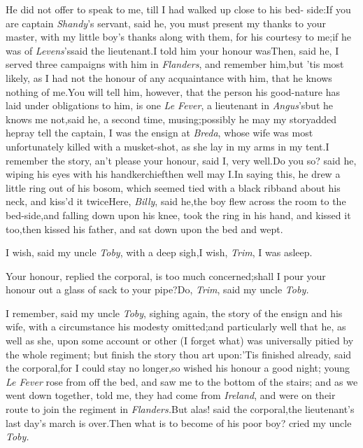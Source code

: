 \documentclass{article}
\begin{document}
He did not offer to speak to me, till I had walked up close to
his bed- side:\tsk If you are captain \textit{Shandy}’s
servant, said he, you must present my thanks to your master, with
my little boy’s thanks along with them, for his courtesy to
me;\tsk if he was of \textit{Levens}’s\tsk said the
lieutenant.\tsk I told him your honour was\tsk Then, said he, I
served three campaigns with him in \textit{Flanders}, and remember
him,\tsk but ’tis most likely, as I had not the honour of
any acquaintance with him, that he knows nothing of me.\tsh You will tell him, however, that
the person his good-nature has laid under obligations to him, is
one \textit{Le Fever}, a lieutenant in
\textit{Angus}’s\tsh but he knows me not,\tsk said
he, a second time, musing;\tsh possibly he may my
story\tsk added he\tsk pray tell the captain, I was the ensign
at \textit{Breda}, whose wife was most unfortunately killed with a
musket-shot, as she lay in my arms in my tent.\tsh I
remember the story, an’t please your honour, said I, very
well.\tsh Do you so? said he, wiping his eyes with his
handkerchief\tsk then well may I.\tsk In saying this, he drew a
little ring out of his bosom, which seemed tied with a black
ribband about his neck, and kiss’d it
twice\tsh Here, \textit{Billy}, said he,\tsk the boy flew
across the room to the bed-side,\tsk and falling down upon his
knee, took the ring in his hand, and kissed it too,\tsk then
kissed his father, and sat down upon the bed and wept.

I wish, said my uncle \textit{Toby}, with a deep sigh,\tsk I
wish, \textit{Trim}, I was asleep.

Your honour, replied the corporal, is too much
concerned;\tsk shall I pour your honour out a glass of sack to
your pipe?\tsh Do, \textit{Trim}, said my uncle
\textit{Toby.}

I remember, said my uncle \textit{Toby}, sighing again, the story
of the ensign and his wife, with a circumstance his modesty
omitted;\tsk and particularly well that he, as well as she, upon
some account or other (I forget what) was universally pitied by the
whole regiment; \tsk but finish the story thou art
upon:\break\tsk ’Tis finished already, said the
corporal,\tsk for I could stay no longer,\tsk so wished his
honour a good night; young \textit{Le Fever} rose from off the bed,
and saw me to the bottom of the stairs; and as we went down
together, told me, they had come from \textit{Ireland}, and were on
their route to join the regiment in
\textit{Flanders.}\tsh But alas! said the
corporal,\tsk the lieutenant’s last day’s march is
over.\tsk Then what is to become of his poor boy? cried my uncle
\textit{Toby.}
\end{document}
